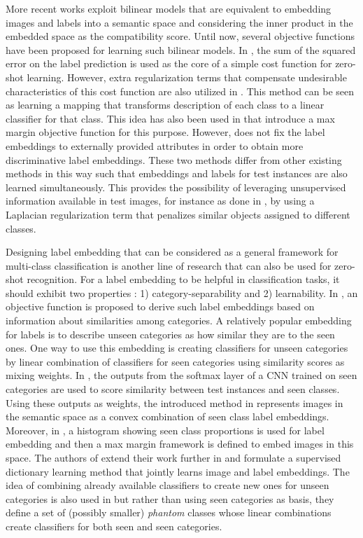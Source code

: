 \documentclass[10pt,twocolumn,letterpaper]{article}
\begin{document}
More recent works exploit bilinear models that are equivalent to embedding images and labels into a semantic space and considering the inner product in the embedded space as the compatibility score. Until now, several objective functions have been proposed for learning such bilinear models.
In \cite{emb15}, the sum of the squared error on the label prediction is used as the core of a simple cost function for zero-shot learning. However, extra regularization terms that compensate undesirable characteristics of this cost function are also utilized in \cite{emb15}.
This method can be seen as learning a mapping that transforms description of each class to a linear classifier for that class. This idea has also been used in \cite{li15max, semi15} that introduce a max margin objective function for this purpose.
However, \cite{semi15} does not fix the label embeddings to externally provided attributes in order to obtain more discriminative label embeddings. These two methods
differ from other existing methods in this way such that embeddings and labels for test instances are also learned simultaneously. This provides the possibility of
leveraging unsupervised information available in test images, for instance as done in \cite{semi15}, by using a Laplacian regularization term that penalizes similar objects assigned to different classes.

Designing label embedding that can be considered as a general framework for multi-class classification is another line of research that can also be used for zero-shot recognition. For a label embedding to be helpful in classification tasks,
 it should exhibit two properties \cite{Yu2013}: 1) category-separability and 2) learnability. In \cite{Yu2013}, an objective function is proposed to derive such label embeddings based on information about similarities among categories.
A relatively popular embedding for labels is to describe unseen categories as how similar they are to the seen ones.
One way to use this embedding is creating classifiers for unseen categories by linear combination of
classifiers for seen categories using similarity scores as mixing weights.
In \cite{convex}, the outputs from the softmax layer of a CNN trained on seen categories are used to score similarity between test instances and seen classes.
Using these outputs as weights, the introduced method in \cite{convex} represents images in the semantic space as a convex combination of seen class label embeddings.
Moreover, in \cite{sse}, a histogram showing seen class proportions is used for label embedding and then a max margin framework is defined to embed images in this space. The authors of \cite{convex} extend their work further in \cite{agnostic} and formulate a supervised dictionary learning method that jointly learns image and label embeddings.
 The idea of combining already available classifiers to create new ones for unseen categories is also used in \cite{Synthesized}
 but rather than using seen categories as basis, they define a set of (possibly smaller) \textit{phantom} classes whose linear combinations
 create classifiers for both seen and seen categories.
\end{document}
